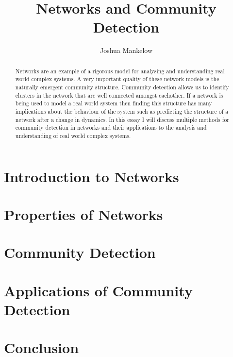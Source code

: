 \documentclass[a4paper]{article}
\title{Networks and Community Detection}
\author{Joshua Mankelow}
\begin{document}
\maketitle

\begin{abstract}
    Networks are an example of a rigorous model for analysing and understanding real world complex systems. A very important quality of these network models is the naturally emergent community structure. Community detection allows us to identify clusters in the network that are well connected amongst eachother. If a network is being used to model a real world system then finding this structure has many implications about the behaviour of the system such as predicting the structure of a network after a change in dynamics. In this essay I will discuss multiple methods for community detection in networks and their applications to the analysis and understanding of real world complex systems. \\
\end{abstract}

\newpage

\tableofcontents
\listoftodos
{}

\newpage

\section{Introduction to Networks}\label{sec:Introduction to Networks}

\newpage

\section{Properties of Networks}\label{sec:Properties of Networks}

\newpage

\section{Community Detection}\label{sec:Community Detection}

\newpage

\section{Applications of Community Detection}\label{sec:Appliations of Community Detection}

\newpage

\section{Conclusion}

\newpage



\end{document}
